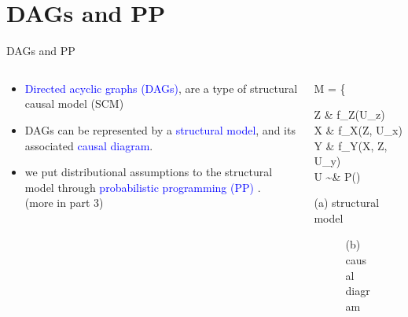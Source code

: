 \section{DAGs and PP}
%
%
\begin{frame}[t, negative]
	\subsectionpage
\end{frame}
%
%
\begin{frame}
	{DAGs and PP}
	\begin{columns}
		\begin{column}{0.5\textwidth}
			\begin{itemize}
				\item \textcolor{blue}{Directed acyclic graphs (DAGs)}, are a type of structural causal model (SCM) \cite{Pearl_2009, Cinelli_et_al_2021}
				\item DAGs can be represented by a \textcolor{blue}{structural model}, and its associated \textcolor{blue}{causal diagram}.
				\item we put distributional assumptions to the structural model through \textcolor{blue}{probabilistic programming (PP)} \cite{Jaynes_2003}. \\
				{\small \alert{(more in part 3)} }
			\end{itemize}
		\end{column}
		\begin{column}{0.5\textwidth}  
			\begin{equ}
				M = \left\{ \begin{aligned} 
					Z \leftarrow & \; f_{Z}(U_{z}) \\
					X \leftarrow & \; f_{X}(Z, U_{x}) \\
					Y \leftarrow & \; f_{Y}(X, Z, U_{y}) \\
					U \sim & \; P()
				\end{aligned} \right
				\caption*{(a) structural model}
			\end{equ}
			\begin{figure}
				\caption*{(b) causal diagram }
			\end{figure}
		\end{column}
	\end{columns}
\end{frame}
